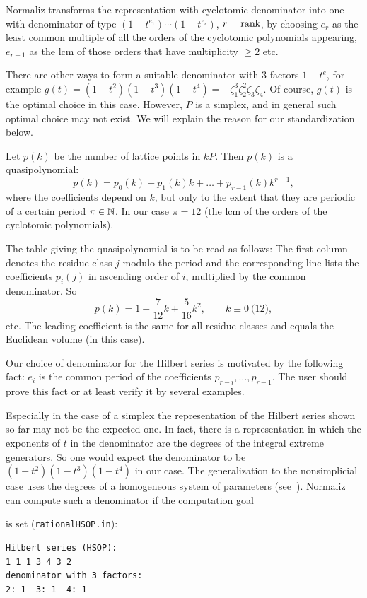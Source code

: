 Normaliz transforms the representation with cyclotomic
denominator into one with denominator of type
$(1-t^{e_1})\cdots(1-t^{e_r})$, $r=\textup{rank}$, by choosing
$e_r$ as the least common multiple of all the orders of the
cyclotomic polynomials appearing, $e_{r-1}$ as the lcm of those
orders that have multiplicity $\ge 2$ etc.

There are other ways to form a suitable denominator with $3$
factors $1-t^e$, for example
$g(t)=(1-t^2)(1-t^3)(1-t^4)=-\zeta_1^3\zeta_2^2\zeta_3\zeta_4$.
Of course, $g(t)$ is the optimal choice in this case. However,
$P$ is a simplex, and in general such optimal choice may not
exist. We will explain the reason for our standardization
below.

Let $p(k)$ be the number of lattice points in $kP$. Then $p(k)$
is a quasipolynomial:
$$
p(k)=p_0(k)+p_1(k)k+\dots+p_{r-1}(k)k^{r-1},
$$
where the coefficients depend on $k$, but only to the extent
that they are periodic of a certain period $\pi\in{\mathbb N}$. In our
case $\pi=12$ (the lcm of the orders of the cyclotomic
polynomials).

The table giving the quasipolynomial is to be read as follows:
The first column denotes the residue class $j$ modulo the
period and the corresponding line lists the coefficients
$p_i(j)$ in ascending order of $i$, multiplied by the common
denominator. So
$$
p(k)=1+\frac{7}{12}k+\frac{5}{16}k^2, \qquad k\equiv 0\pod{12},
$$
etc. The leading coefficient is the same for all residue
classes and equals the Euclidean volume (in this case).

Our choice of denominator for the Hilbert series is motivated
by the following fact: $e_i$ is the common period of the
coefficients $p_{r-i},\dots,p_{r-1}$. The user should prove
this fact or at least verify it by several examples.

Especially in the case of a simplex the representation of the Hilbert series shown so far may not be the expected one. In fact, there is a representation in which the exponents of $t$ in the denominator are the degrees of the integral extreme generators. So one would expect the denominator to be $(1-t^2)(1-t^3)(1-t^4)$ in our case. The generalization to the nonsimplicial case uses the degrees of a homogeneous system of parameters (see~\cite[p.~200]{BG}). Normaliz can compute such a denominator if the computation goal 
\begin{itemize}
	\itemtt[HSOP] 
\end{itemize}
is set (\verb|rationalHSOP.in|):
\begin{Verbatim}
Hilbert series (HSOP):
1 1 1 3 4 3 2 
denominator with 3 factors:
2: 1  3: 1  4: 1 
\end{Verbatim}


